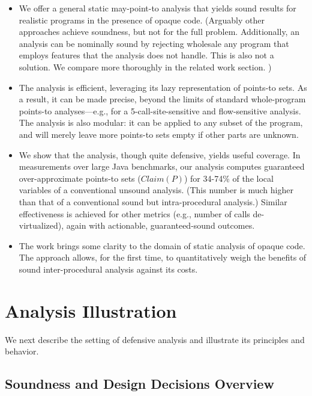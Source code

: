 \begin{itemize}
\item We offer a general static may-point-to analysis that yields sound results for realistic programs in the presence of opaque code. (Arguably other approaches \cite{ecoop:2004:Hirzel,article:2007:Hirzel,pldi:2007:Lattner} achieve soundness, but not for the full problem. Additionally, an analysis can be nominally sound by rejecting wholesale any program that employs features that the analysis does not handle. This is also not a solution. We compare more thoroughly in the related work section. \todo{})

\item The analysis is efficient, leveraging its lazy representation of points-to sets. As a result, it can be made precise, beyond the limits of standard whole-program points-to analyses---e.g., for a 5-call-site-sensitive and flow-sensitive analysis. The analysis is also modular: it can be applied to any subset of the program, and will merely leave more points-to sets empty if other parts are unknown.
  
\item We show that the analysis, though quite defensive, yields useful coverage. In measurements over large Java benchmarks, our analysis computes guaranteed over-approximate points-to sets ($Claim(P)$) for 34-74\% of the local variables of a conventional unsound analysis. (This number is much higher than that of a conventional sound but intra-procedural analysis.) Similar effectiveness is achieved for other metrics (e.g., number of calls de-virtualized), again with actionable, guaranteed-sound outcomes.

\item The work brings some clarity to the domain of static analysis of opaque code. The approach allows, for the first time, to quantitatively weigh the benefits of sound inter-procedural analysis against its costs.
\end{itemize}


\section{Analysis Illustration}

We next describe the setting of defensive analysis and illustrate its principles and behavior.

\subsection{Soundness and Design Decisions Overview}

